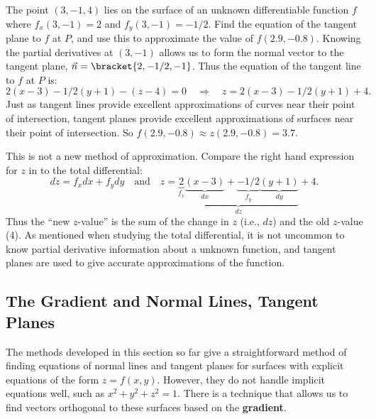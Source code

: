 \begin{example}\label{ex_tpl7}
The point $(3,-1,4)$ lies on the surface of an unknown differentiable function $f$ where $f_x(3,-1) = 2$ and $f_y(3,-1) = -1/2$. Find the equation of the tangent plane to $f$ at $P$, and use this to approximate the value of $f(2.9,-0.8)$.
\solution
Knowing the partial derivatives at $(3,-1)$ allows us to form the normal vector to the tangent plane, $\vec n =\bracket{2,-1/2,-1}$. Thus the equation of the tangent line to $f$ at $P$ is:
\begin{equation}
2(x-3)-1/2(y+1) - (z-4) = 0
\quad \Rightarrow \quad
z = 2(x-3)-1/2(y+1)+4.\label{eq:tpl7}
\end{equation}
Just as tangent lines provide excellent approximations of curves near their point of intersection, tangent planes provide excellent approximations of surfaces near their point of intersection. So $f(2.9,-0.8) \approx z(2.9,-0.8) = 3.7.$

This is not a new method of approximation. Compare the right hand expression for $z$ in  to the total differential:
\[
dz = f_xdx + f_ydy \quad \text{and} \quad z =
\underbrace{\underbrace{2}_{f_x}\underbrace{(x-3)}_{dx}
+\underbrace{-1/2}_{f_y}\underbrace{(y+1)}_{dy}}_{dz}+4.
\]
Thus the ``new $z$-value'' is the sum of the change in $z$ (i.e., $dz$) and the old $z$-value (4). As mentioned when studying the total differential, it is not uncommon to know partial derivative information about a unknown function, and tangent planes are used to give accurate approximations of the function.
\end{example}

\subsection{The Gradient and Normal Lines, Tangent Planes}

The methods developed in this section so far give a straightforward method of finding equations of normal lines and tangent planes for surfaces with explicit equations of the form $z=f(x,y)$. However, they do not handle implicit equations well, such as $x^2+y^2+z^2=1$. There is a technique that allows us to find vectors orthogonal to these surfaces based on the \textbf{gradient}.



